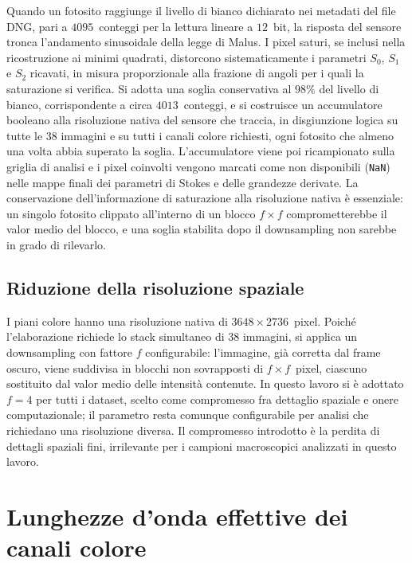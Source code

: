 Quando un fotosito raggiunge il livello di bianco dichiarato nei metadati del file DNG, pari a $4095$~conteggi per la lettura lineare a $12$~bit, la risposta del sensore tronca l'andamento sinusoidale della legge di Malus. I pixel saturi, se inclusi nella ricostruzione ai minimi quadrati, distorcono sistematicamente i parametri $S_0$, $S_1$ e $S_2$ ricavati, in misura proporzionale alla frazione di angoli per i quali la saturazione si verifica. Si adotta una soglia conservativa al $98\%$ del livello di bianco, corrispondente a circa $4013$~conteggi, e si costruisce un accumulatore booleano alla risoluzione nativa del sensore che traccia, in disgiunzione logica su tutte le 38 immagini e su tutti i canali colore richiesti, ogni fotosito che almeno una volta abbia superato la soglia. L'accumulatore viene poi ricampionato sulla griglia di analisi e i pixel coinvolti vengono marcati come non disponibili (\texttt{NaN}) nelle mappe finali dei parametri di Stokes e delle grandezze derivate. La conservazione dell'informazione di saturazione alla risoluzione nativa è essenziale: un singolo fotosito clippato all'interno di un blocco $f \times f$ comprometterebbe il valor medio del blocco, e una soglia stabilita dopo il downsampling non sarebbe in grado di rilevarlo.

\subsection{Riduzione della risoluzione spaziale}
\label{subsec:downsampling}

I piani colore hanno una risoluzione nativa di $3648 \times 2736$~pixel. Poiché l'elaborazione richiede lo stack simultaneo di 38 immagini, si applica un downsampling con fattore $f$ configurabile: l'immagine, già corretta dal frame oscuro, viene suddivisa in blocchi non sovrapposti di $f \times f$~pixel, ciascuno sostituito dal valor medio delle intensità contenute. %
In questo lavoro si è adottato $f = 4$ per tutti i dataset, scelto come compromesso fra dettaglio spaziale e onere computazionale; il parametro resta comunque configurabile per analisi che richiedano una risoluzione diversa. Il compromesso introdotto è la perdita di dettagli spaziali fini, irrilevante per i campioni macroscopici analizzati in questo lavoro.

\section{Lunghezze d'onda effettive dei canali colore}
\label{sec:centroide}

